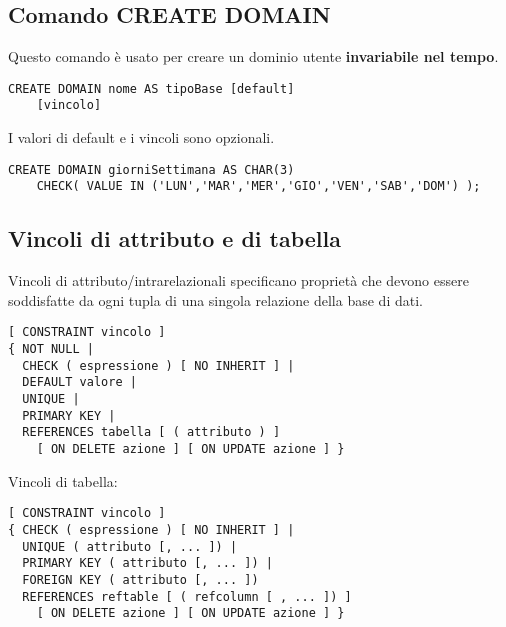 \documentclass[a4paper, 10pt, titlepage]{article}
\begin{document}
	\subsection{Comando CREATE DOMAIN}
	Questo comando è usato per creare un dominio utente \textbf{invariabile nel tempo}.
	\begin{lstlisting}
CREATE DOMAIN nome AS tipoBase [default]
	[vincolo]
	\end{lstlisting} \medskip
	I valori di default e i vincoli sono opzionali.

	\begin{lstlisting}
CREATE DOMAIN giorniSettimana AS CHAR(3)
	CHECK( VALUE IN ('LUN','MAR','MER','GIO','VEN','SAB','DOM') );
	\end{lstlisting}

	\subsection{Vincoli di attributo e di tabella}
	Vincoli di attributo/intrarelazionali specificano proprietà che devono
	essere soddisfatte da ogni tupla di una singola relazione della base di
	dati.
	
	\begin{lstlisting}
[ CONSTRAINT vincolo ]
{ NOT NULL |
  CHECK ( espressione ) [ NO INHERIT ] |
  DEFAULT valore |
  UNIQUE |
  PRIMARY KEY |
  REFERENCES tabella [ ( attributo ) ]
    [ ON DELETE azione ] [ ON UPDATE azione ] }
	\end{lstlisting}
	
	Vincoli di tabella:
	\begin{lstlisting}
[ CONSTRAINT vincolo ]
{ CHECK ( espressione ) [ NO INHERIT ] |
  UNIQUE ( attributo [, ... ]) |
  PRIMARY KEY ( attributo [, ... ]) |
  FOREIGN KEY ( attributo [, ... ])
  REFERENCES reftable [ ( refcolumn [ , ... ]) ]
	[ ON DELETE azione ] [ ON UPDATE azione ] }
	\end{lstlisting}
\end{document}
